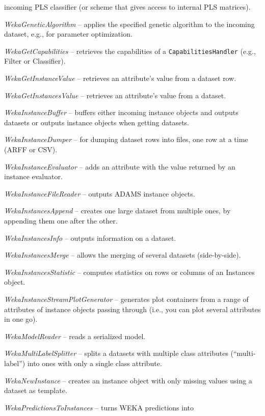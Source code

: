 \begin{tight_itemize}
	incoming PLS classifier (or scheme that gives access to internal PLS matrices).
	\item \textit{WekaGeneticAlgorithm} -- applies the specified genetic
	algorithm to the incoming dataset, e.g., for parameter optimization.
	\item \textit{WekaGetCapabilities} -- retrieves the capabilities of a
	\texttt{CapabilitiesHandler} (e.g., Filter or Classifier).
	\item \textit{WekaGetInstanceValue} -- retrieves an attribute's value from
	a dataset row.
	\item \textit{WekaGetInstancesValue} -- retrieves an attribute's value from
	a dataset.
	\item \textit{WekaInstanceBuffer} -- buffers either incoming instance 
	objects and outputs datasets or outputs instance objects when getting
	datasets.
	\item \textit{WekaInstanceDumper} -- for dumping dataset rows into files,
	one row at a time (ARFF or CSV).
	\item \textit{WekaInstanceEvaluator} -- adds an attribute with the value
	returned by an instance evaluator.
	\item \textit{WekaInstanceFileReader} -- outputs ADAMS instance objects.
	\item \textit{WekaInstancesAppend} -- creates one large dataset from 
	multiple ones, by appending them one after the other.
	\item \textit{WekaInstancesInfo} -- outputs information on a dataset.
	\item \textit{WekaInstancesMerge} -- allows the merging of several datasets 
	(side-by-side).
	\item \textit{WekaInstancesStatistic} -- computes statistics on rows
	or columns of an Instances object.
	\item \textit{WekaInstanceStreamPlotGenerator} -- generates plot containers
	from a range of attributes of instance objects passing through (i.e., you 
	can plot several attributes in one go).
	\item \textit{WekaModelReader} -- reads a serialized model.
	\item \textit{WekaMultiLabelSplitter} -- splits a datasets with multiple
	class attributes (``multi-label'') into ones with only a single class 
	attribute.
	\item \textit{WekaNewInstance} -- creates an instance object with only 
	missing values using a dataset as template.
	\item \textit{WekaPredictionsToInstances} -- turns WEKA predictions into

\end{tight_itemize}
